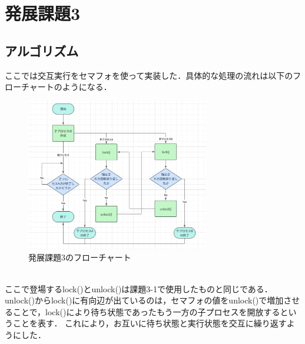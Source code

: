 \documentclass[dvipdfmx]{jarticle}
\begin{document}
\section{発展課題3}
\subsection{アルゴリズム}
ここでは交互実行をセマフォを使って実装した．具体的な処理の流れは以下のフローチャートのようになる．
\begin{figure}[h]
    \centering
    \includegraphics[width=8cm]{hatten3hurotya.png}
    \caption{発展課題3のフローチャート}
\end{figure}
\\ここで登場するlock()とunlock()は課題3-1で使用したものと同じである．unlock()からlock()に有向辺が出ているのは，セマフォの値をunlock()で増加させることで，lock()により待ち状態であったもう一方の子プロセスを開放するということを表す．
これにより，お互いに待ち状態と実行状態を交互に繰り返すようにした．
\end{document}
